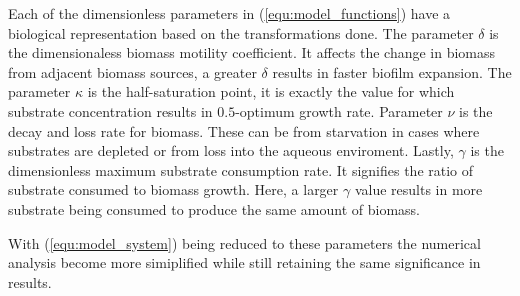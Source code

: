 Each of the dimensionless parameters in (\ref{equ:model_functions}) have a biological representation based on the transformations done.
The parameter $\delta$ is the dimensionaless biomass motility coefficient.
It affects the change in biomass from adjacent biomass sources, a greater $\delta$ results in faster biofilm expansion.
The parameter $\kappa$ is the half-saturation point, it is exactly the value for which substrate concentration results in $0.5$-optimum growth rate.
Parameter $\nu$ is the decay and loss rate for biomass.
These can be from starvation in cases where substrates are depleted or from loss into the aqueous enviroment.
Lastly, $\gamma$ is the dimensionless maximum substrate consumption rate.
It signifies the ratio of substrate consumed to biomass growth.
Here, a larger $\gamma$ value results in more substrate being consumed to  produce the same amount of biomass. 

With (\ref{equ:model_system}) being reduced to these parameters the numerical analysis become more simiplified while still retaining the same significance in results.

